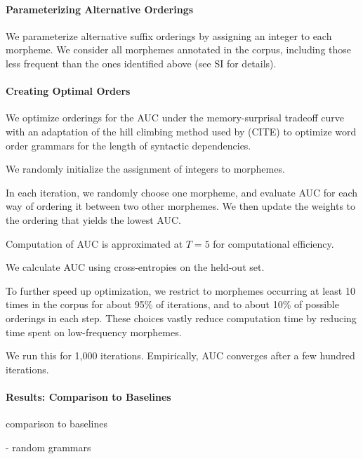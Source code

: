 \paragraph{Parameterizing Alternative Orderings}

We parameterize alternative suffix orderings by assigning an integer to each morpheme.
We consider all morphemes annotated in the corpus, including those less frequent than the ones identified above (see SI for details).

\paragraph{Creating Optimal Orders}

We optimize orderings for the AUC under the memory-surprisal tradeoff curve with an adaptation of the hill climbing method used by (CITE) to optimize word order grammars for the length of syntactic dependencies.

We randomly initialize the assignment of integers to morphemes.

In each iteration, we randomly choose one morpheme, and evaluate AUC for each way of ordering it between two other morphemes.
We then update the weights to the ordering that yields the lowest AUC.

Computation of AUC is approximated at $T=5$ for computational efficiency.

We calculate AUC using cross-entropies on the held-out set.

To further speed up optimization, we restrict to morphemes occurring at least 10 times in the corpus for about 95\% of iterations, and to about 10\% of possible orderings in each step.
These choices vastly reduce computation time by reducing time spent on low-frequency morphemes.

We run this for 1,000 iterations. Empirically, AUC converges after a few hundred iterations.

\paragraph{Results: Comparison to Baselines}
comparison to baselines

- random grammars



